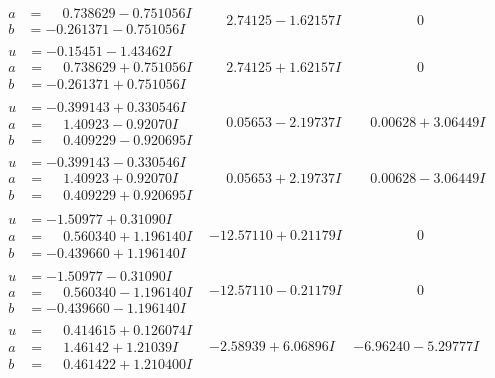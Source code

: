 \documentclass[1p]{elsarticle_modified}
\theoremstyle{definition}
\begin{document}
$$\begin{array}{c|c|c}
\begin{aligned}
a &= \phantom{-}0.738629 - 0.751056 I \\
b &= -0.261371 - 0.751056 I\end{aligned}
 & \phantom{-}2.74125 - 1.62157 I & \phantom{-0.000000 } 0 \\ \hline\begin{aligned}
u &= -0.15451 - 1.43462 I \\
a &= \phantom{-}0.738629 + 0.751056 I \\
b &= -0.261371 + 0.751056 I\end{aligned}
 & \phantom{-}2.74125 + 1.62157 I & \phantom{-0.000000 } 0 \\ \hline\begin{aligned}
u &= -0.399143 + 0.330546 I \\
a &= \phantom{-}1.40923 - 0.92070 I \\
b &= \phantom{-}0.409229 - 0.920695 I\end{aligned}
 & \phantom{-}0.05653 - 2.19737 I & \phantom{-}0.00628 + 3.06449 I \\ \hline\begin{aligned}
u &= -0.399143 - 0.330546 I \\
a &= \phantom{-}1.40923 + 0.92070 I \\
b &= \phantom{-}0.409229 + 0.920695 I\end{aligned}
 & \phantom{-}0.05653 + 2.19737 I & \phantom{-}0.00628 - 3.06449 I \\ \hline\begin{aligned}
u &= -1.50977 + 0.31090 I \\
a &= \phantom{-}0.560340 + 1.196140 I \\
b &= -0.439660 + 1.196140 I\end{aligned}
 & -12.57110 + 0.21179 I & \phantom{-0.000000 } 0 \\ \hline\begin{aligned}
u &= -1.50977 - 0.31090 I \\
a &= \phantom{-}0.560340 - 1.196140 I \\
b &= -0.439660 - 1.196140 I\end{aligned}
 & -12.57110 - 0.21179 I & \phantom{-0.000000 } 0 \\ \hline\begin{aligned}
u &= \phantom{-}0.414615 + 0.126074 I \\
a &= \phantom{-}1.46142 + 1.21039 I \\
b &= \phantom{-}0.461422 + 1.210400 I\end{aligned}
 & -2.58939 + 6.06896 I & -6.96240 - 5.29777 I \\ \hline\begin{aligned}

\end{aligned}
\end{array}$$
\end{document}
